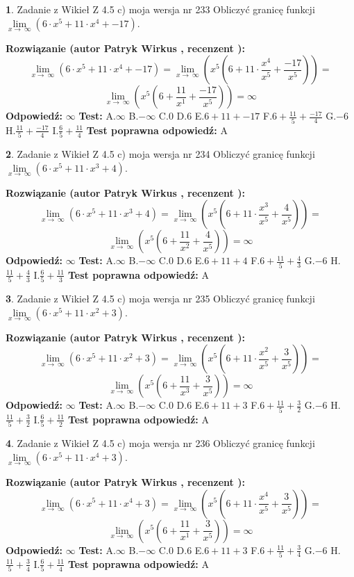 \documentclass[12pt, a4paper]{article}
\theoremstyle{definition} %
\newtheorem{zad}{}
\newcommand{\zadStart}[1]{\begin{zad}#1\newline}
\newcommand{\zadStop}{\end{zad}}
\newcommand{\rozwStart}[2]{\noindent \textbf{Rozwiązanie (autor #1 , recenzent #2): }\newline}
\newcommand{\rozwStop}{\newline}
\newcommand{\odpStart}{\noindent \textbf{Odpowiedź:}\newline}
\newcommand{\odpStop}{\newline}
\newcommand{\testStart}{\noindent \textbf{Test:}\newline}
\newcommand{\testStop}{\newline}
\newcommand{\kluczStart}{\noindent \textbf{Test poprawna odpowiedź:}\newline}
\newcommand{\kluczStop}{\newline}
\begin{document}
\zadStart{Zadanie z Wikieł Z 4.5 c) moja wersja nr 233}
Obliczyć granicę funkcji  $\lim\limits_{x\to\ \infty}(6 \cdot x^{5}+11 \cdot x^{4}+-17)$.
\zadStop
\rozwStart{Patryk Wirkus}{}
$$\lim\limits_{x\to\ \infty}(6 \cdot x^{5}+11 \cdot x^{4}+-17) = \lim\limits_{x\to\ \infty}(x^{5}(6 +11 \cdot \frac{x^{4}}{x^{5}}+\frac{-17}{x^{5}})) =$$ $$\lim\limits_{x\to\ \infty}(x^{5}(6 +\frac{11}{x^{1}}+\frac{-17}{x^{5}})) =\infty$$
\rozwStop
\odpStart
$\infty$
\odpStop
\testStart
A.$\infty$ B.$-\infty$ C.$0$ D.$6$ E.$6 + 11 + -17$
F.$6+\frac{11}{5}+\frac{-17}{4}$ G.$-6$
H.$\frac{11}{5}+\frac{-17}{4}$
I.$\frac{6}{5}+\frac{11}{4}$
\testStop
\kluczStart
A
\kluczStop



\zadStart{Zadanie z Wikieł Z 4.5 c) moja wersja nr 234}
Obliczyć granicę funkcji  $\lim\limits_{x\to\ \infty}(6 \cdot x^{5}+11 \cdot x^{3}+4)$.
\zadStop
\rozwStart{Patryk Wirkus}{}
$$\lim\limits_{x\to\ \infty}(6 \cdot x^{5}+11 \cdot x^{3}+4) = \lim\limits_{x\to\ \infty}(x^{5}(6 +11 \cdot \frac{x^{3}}{x^{5}}+\frac{4}{x^{5}})) =$$ $$\lim\limits_{x\to\ \infty}(x^{5}(6 +\frac{11}{x^{2}}+\frac{4}{x^{5}})) =\infty$$
\rozwStop
\odpStart
$\infty$
\odpStop
\testStart
A.$\infty$ B.$-\infty$ C.$0$ D.$6$ E.$6 + 11 + 4$
F.$6+\frac{11}{5}+\frac{4}{3}$ G.$-6$
H.$\frac{11}{5}+\frac{4}{3}$
I.$\frac{6}{5}+\frac{11}{3}$
\testStop
\kluczStart
A
\kluczStop



\zadStart{Zadanie z Wikieł Z 4.5 c) moja wersja nr 235}
Obliczyć granicę funkcji  $\lim\limits_{x\to\ \infty}(6 \cdot x^{5}+11 \cdot x^{2}+3)$.
\zadStop
\rozwStart{Patryk Wirkus}{}
$$\lim\limits_{x\to\ \infty}(6 \cdot x^{5}+11 \cdot x^{2}+3) = \lim\limits_{x\to\ \infty}(x^{5}(6 +11 \cdot \frac{x^{2}}{x^{5}}+\frac{3}{x^{5}})) =$$ $$\lim\limits_{x\to\ \infty}(x^{5}(6 +\frac{11}{x^{3}}+\frac{3}{x^{5}})) =\infty$$
\rozwStop
\odpStart
$\infty$
\odpStop
\testStart
A.$\infty$ B.$-\infty$ C.$0$ D.$6$ E.$6 + 11 + 3$
F.$6+\frac{11}{5}+\frac{3}{2}$ G.$-6$
H.$\frac{11}{5}+\frac{3}{2}$
I.$\frac{6}{5}+\frac{11}{2}$
\testStop
\kluczStart
A
\kluczStop



\zadStart{Zadanie z Wikieł Z 4.5 c) moja wersja nr 236}
Obliczyć granicę funkcji  $\lim\limits_{x\to\ \infty}(6 \cdot x^{5}+11 \cdot x^{4}+3)$.
\zadStop
\rozwStart{Patryk Wirkus}{}
$$\lim\limits_{x\to\ \infty}(6 \cdot x^{5}+11 \cdot x^{4}+3) = \lim\limits_{x\to\ \infty}(x^{5}(6 +11 \cdot \frac{x^{4}}{x^{5}}+\frac{3}{x^{5}})) =$$ $$\lim\limits_{x\to\ \infty}(x^{5}(6 +\frac{11}{x^{1}}+\frac{3}{x^{5}})) =\infty$$
\rozwStop
\odpStart
$\infty$
\odpStop
\testStart
A.$\infty$ B.$-\infty$ C.$0$ D.$6$ E.$6 + 11 + 3$
F.$6+\frac{11}{5}+\frac{3}{4}$ G.$-6$
H.$\frac{11}{5}+\frac{3}{4}$
I.$\frac{6}{5}+\frac{11}{4}$
\testStop
\kluczStart
A
\kluczStop
\end{document}
